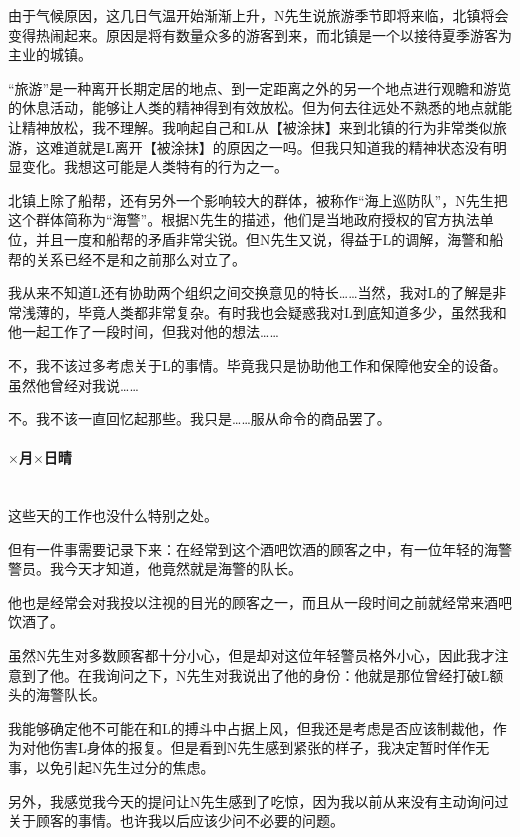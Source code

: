 由于气候原因，这几日气温开始渐渐上升，N先生说旅游季节即将来临，北镇将会变得热闹起来。原因是将有数量众多的游客到来，而北镇是一个以接待夏季游客为主业的城镇。

“旅游”是一种离开长期定居的地点、到一定距离之外的另一个地点进行观瞻和游览的休息活动，能够让人类的精神得到有效放松。但为何去往远处不熟悉的地点就能让精神放松，我不理解。我响起自己和L从【被涂抹】来到北镇的行为非常类似旅游，这难道就是L离开【被涂抹】的原因之一吗。但我只知道我的精神状态没有明显变化。我想这可能是人类特有的行为之一。

北镇上除了船帮，还有另外一个影响较大的群体，被称作“海上巡防队”，N先生把这个群体简称为“海警”。根据N先生的描述，他们是当地政府授权的官方执法单位，并且一度和船帮的矛盾非常尖锐。但N先生又说，得益于L的调解，海警和船帮的关系已经不是和之前那么对立了。

我从来不知道L还有协助两个组织之间交换意见的特长……当然，我对L的了解是非常浅薄的，毕竟人类都非常复杂。有时我也会疑惑我对L到底知道多少，虽然我和他一起工作了一段时间，但我对他的想法……

不，我不该过多考虑关于L的事情。毕竟我只是协助他工作和保障他安全的设备。虽然他曾经对我说……

不。我不该一直回忆起那些。我只是……服从命令的商品罢了。

\par

\paragraph*{$\times$月$\times$日\quad 晴}\mbox{}\\

这些天的工作也没什么特别之处。

但有一件事需要记录下来：在经常到这个酒吧饮酒的顾客之中，有一位年轻的海警警员。我今天才知道，他竟然就是海警的队长。

他也是经常会对我投以注视的目光的顾客之一，而且从一段时间之前就经常来酒吧饮酒了。

虽然N先生对多数顾客都十分小心，但是却对这位年轻警员格外小心，因此我才注意到了他。在我询问之下，N先生对我说出了他的身份：他就是那位曾经打破L额头的海警队长。

我能够确定他不可能在和L的搏斗中占据上风，但我还是考虑是否应该制裁他，作为对他伤害L身体的报复。但是看到N先生感到紧张的样子，我决定暂时佯作无事，以免引起N先生过分的焦虑。

另外，我感觉我今天的提问让N先生感到了吃惊，因为我以前从来没有主动询问过关于顾客的事情。也许我以后应该少问不必要的问题。

\par

